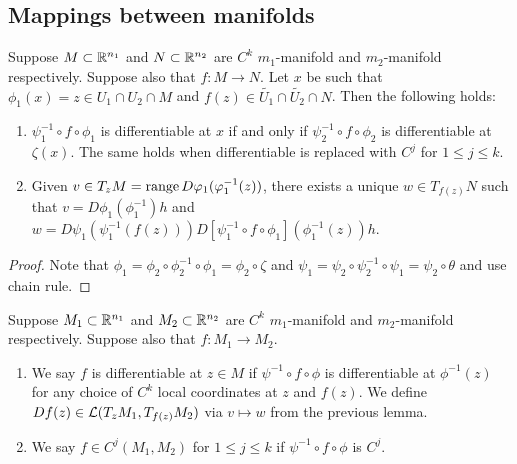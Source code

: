 \documentclass[a4paper]{article}
\newcommand{\TODO}{\textcolor{red}{\textbf{*** TO-DO ***}}}
\begin{document}
\subsection{Mappings between manifolds}

\fbox{\TODO: Add picture}

\begin{lemma}
Suppose $M \subset \mathbb{R}^{n_1}$ and $N \subset \mathbb{R}^{n_2}$ are 
$C^k$ $m_1$-manifold and $m_2$-manifold respectively. 
Suppose also that $f : M \to N$.
Let $x$ be such that $\phi_1(x) = z \in U_1 \cap U_2 \cap M$
and $f(z) \in \tilde{U_1} \cap \tilde{U_2} \cap N$.
Then the following holds: 
\begin{enumerate}
\item $\psi_1^{-1} \circ f \circ \phi_1$ is differentiable 
at $x$ if and only if $\psi_2^{-1} \circ f \circ \phi_2$
is differentiable at $\zeta(x)$.
The same holds when differentiable is replaced with 
$C^j$ for $1 \leq j \leq k$.

\item Given $v \in T_z M = \operatorname{range} D \varphi_1 (\varphi_1^{-1}(z))$, 
there exists a unique $w \in T_{f(z)} N$ such that 
$v = D \phi_1 (\phi_1^{-1}) h$ and 
$w = D \psi_1 (\psi_1^{-1} (f(z))) 
D [\psi_1^{-1} \circ f \circ \phi_1] (\phi_1^{-1}(z)) h$.
\end{enumerate}
\end{lemma}

\begin{proof}
Note that 
$\phi_1 = \phi_2 \circ \phi_2^{-1} \circ \phi_1 = \phi_2 \circ 
\zeta$ and $\psi_1 = \psi_2 \circ \psi_2^{-1} \circ \psi_1 
= \psi_2 \circ \theta$ and use chain rule.
\end{proof}

\begin{defi}
Suppose $M_1 \subset \mathbb{R}^{n_1}$ and $M_2 \subset \mathbb{R}^{n_2}$ are 
$C^k$ $m_1$-manifold and $m_2$-manifold respectively. 
Suppose also that $f : M_1 \to M_2$.

\begin{enumerate}
\item We say $f$ is differentiable at $z \in M$ 
if $\psi^{-1} \circ f \circ \phi$ is differentiable 
at $\phi^{-1}(z)$ for any choice of $C^k$ local coordinates
at $z$ and $f(z)$. We define 
$Df(z) \in \mathcal{L}(T_z M_1, T_{f(z)} M_2)$ via $v \mapsto w$ 
from the previous lemma.

\item We say $f \in C^j (M_1, M_2)$ for $1 \leq j \leq k$ 
if $\psi^{-1} \circ f \circ \phi$ is $C^j$.
\end{enumerate}
\end{defi}
\end{document}
